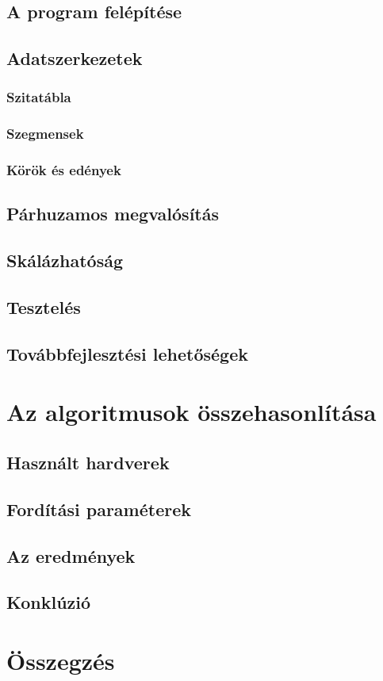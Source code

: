 \documentclass[twoside, a4paper, 12pt]{article}
\begin{document}
\subsection{A program felépítése}

\subsection{Adatszerkezetek}

\subsubsection{Szitatábla}
\subsubsection{Szegmensek}
\subsubsection{Körök és edények}

\subsection{Párhuzamos megvalósítás}

\subsection{Skálázhatóság}

\subsection{Tesztelés} \label{test}

\subsection{Továbbfejlesztési lehetőségek}

\clearpage
\section{Az algoritmusok összehasonlítása}

\subsection{Használt hardverek}

\subsection{Fordítási paraméterek} \label{optpar}

\subsection{Az eredmények}

\subsection{Konklúzió}

\clearpage
\section{Összegzés}
\end{document}
